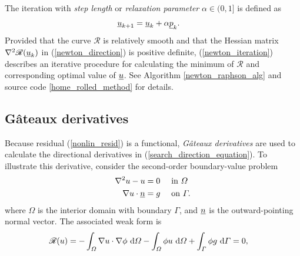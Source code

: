 The iteration with \emph{step length} or \emph{relaxation parameter} $\alpha \in (0,1]$ is defined as
\begin{align}
  \label{newton_iteration}
  \underline{u}_{k+1} &= \underline{u}_k + \alpha \underline{p}_k.
\end{align}
Provided that the curve $\mathscr{R}$ is relatively smooth and that the Hessian matrix $\nabla^2 \mathscr{R}(\underline{u}_k)$ in (\ref{newton_direction}) is positive definite, (\ref{newton_iteration}) describes an iterative procedure for calculating the minimum of $\mathscr{R}$ and corresponding optimal value of $\underline{u}$.  See Algorithm \ref{newton_raphson_alg} and \CSLVR source code \ref{home_rolled_method} for details.

\subsection{G\^{a}teaux derivatives} \label{ssn_gateaux}

Because residual (\ref{nonlin_resid}) is a functional,   \emph{G\^{a}teaux derivatives} are used to calculate the directional derivatives in (\ref{search_direction_equation}).  To illustrate this derivative, consider the second-order boundary-value problem
\begin{align*}
  \nabla^2 u - u &= 0 &&\text{ in } \varOmega \\
  \nabla u \cdot \underline{n} &= g &&\text{ on } \varGamma.
\end{align*}
where $\Omega$ is the interior domain with boundary $\Gamma$, and $\underline{n}$ is the outward-pointing normal vector.  The associated weak form is
\begin{align}
  \label{gateaux_example_form}
  \mathscr{R}(u) &= - \int_{\varOmega} \nabla u \cdot \nabla \phi \ \mathrm{d}\varOmega - \int_{\varOmega} \phi u \ \mathrm{d}\varOmega + \int_{\varGamma} \phi g \ \mathrm{d}\varGamma = 0,
\end{align}

